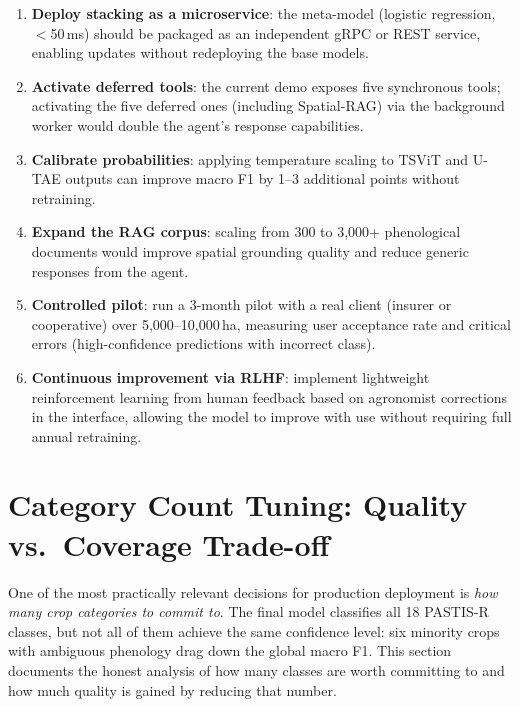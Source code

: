 \documentclass{article}
\begin{document}
\begin{enumerate}[leftmargin=*]
    \item \textbf{Deploy stacking as a microservice}: the meta-model
    (logistic regression, $<$50\,ms) should be packaged as an independent
    gRPC or REST service, enabling updates without redeploying the base
    models.

    \item \textbf{Activate deferred tools}: the current demo exposes five
    synchronous tools; activating the five deferred ones (including
    Spatial-RAG) via the background worker would double the agent's
    response capabilities.

    \item \textbf{Calibrate probabilities}: applying temperature scaling
    to TSViT and U-TAE outputs can improve macro F1 by 1--3 additional
    points without retraining.

    \item \textbf{Expand the RAG corpus}: scaling from 300 to 3,000+
    phenological documents would improve spatial grounding quality and
    reduce generic responses from the agent.

    \item \textbf{Controlled pilot}: run a 3-month pilot with a real
    client (insurer or cooperative) over 5,000--10,000\,ha, measuring
    user acceptance rate and critical errors (high-confidence predictions
    with incorrect class).

    \item \textbf{Continuous improvement via RLHF}: implement lightweight
    reinforcement learning from human feedback based on agronomist
    corrections in the interface, allowing the model to improve with use
    without requiring full annual retraining.
\end{enumerate}

\section{Category Count Tuning: Quality vs.\ Coverage Trade-off}

One of the most practically relevant decisions for production deployment
is \textit{how many crop categories to commit to}. The final model
classifies all 18 PASTIS-R classes, but not all of them achieve the same
confidence level: six minority crops with ambiguous phenology drag down
the global macro F1. This section documents the honest analysis of how
many classes are worth committing to and how much quality is gained by
reducing that number.
\end{document}
